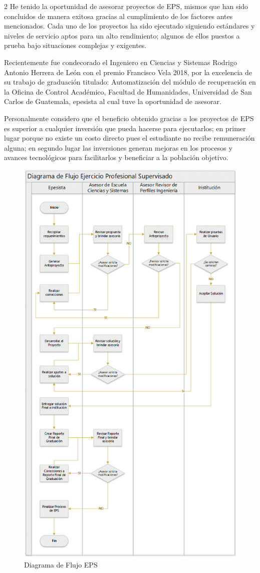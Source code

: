\documentclass[11pt,spanish,Letterpaper,openany]{book}
\begin{document}
\begin {multicols}{2}
He tenido la oportunidad de asesorar proyectos de EPS, mismos que han sido concluidos de manera exitosa gracias al cumplimiento de los factores antes mencionados. Cada uno de los proyectos ha sido ejecutado siguiendo estándares y niveles de servicio aptos para un alto rendimiento; algunos de ellos puestos a prueba bajo situaciones complejas y exigentes.

Recientemente fue condecorado el Ingeniero en Ciencias y Sistemas Rodrigo Antonio Herrera de León con el premio Francisco Vela 2018, por la excelencia de su trabajo de graduación titulado: Automatización del módulo de recuperación en la Oficina de Control Académico, Facultad de Humanidades, Universidad de San Carlos de Guatemala, epesista al cual tuve la oportunidad de asesorar.

Personalmente considero que el beneficio obtenido gracias a los proyectos de EPS es superior a cualquier inversión que pueda hacerse para ejecutarlos; en primer lugar porque no existe un costo directo pues el estudiante no recibe remuneración alguna; en segundo lugar las inversiones generan mejoras en los procesos y avances tecnológicos para facilitarlos y beneficiar a la población objetivo.

\end {multicols}

\begin{figure}[H]

{\centering \includegraphics[width=0.7\linewidth]{images/201901-bfuentes-image01} 

}

\caption{Diagrama de Flujo EPS}\label{fig:unnamed-chunk-9}
\end{figure}
\end{document}
